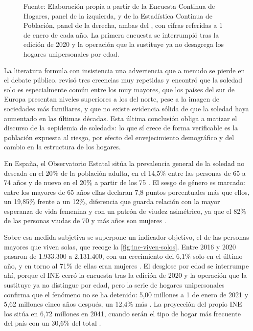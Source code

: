 \begin{figure}[tbp]
    \vspace{2pt}
    \parbox{0.94\textwidth}{\footnotesize Fuente: Elaboración propia a partir de la Encuesta Continua de Hogares, panel de la izquierda, y de la Estadística Continua de Población, panel de la derecha, ambas del \textcite{INEech2020,INEecp2026}, con cifras referidas a 1 de enero de cada año. La primera encuesta se interrumpió tras la edición de 2020 y la operación que la sustituye ya no desagrega los hogares unipersonales por edad.}
\end{figure}

La literatura formula con insistencia una advertencia que a menudo se pierde en el debate público. \textcite{Dykstra2009} revisó tres creencias muy repetidas y encontró que la soledad solo es especialmente común entre los muy mayores, que los países del sur de Europa presentan niveles superiores a los del norte, pese a la imagen de sociedades más familiares, y que no existe evidencia sólida de que la soledad haya aumentado en las últimas décadas. Esta última conclusión obliga a matizar el discurso de la «epidemia de soledad»: lo que sí crece de forma verificable es la población expuesta al riesgo, por efecto del envejecimiento demográfico y del cambio en la estructura de los hogares.

En España, el Observatorio Estatal sitúa la prevalencia general de la soledad no deseada en el 20\% de la población adulta, en el 14,5\% entre las personas de 65 a 74 años y de nuevo en el 20\% a partir de los 75 \citep{SoledadES,FundacionONCE}. El sesgo de género es marcado: entre los mayores de 65 años ellas declaran 7,8 puntos porcentuales más que ellos, un 19,85\% frente a un 12\%, diferencia que guarda relación con la mayor esperanza de vida femenina y con un patrón de viudez asimétrico, ya que el 82\% de las personas viudas de 70 y más años son mujeres \citep{FundacionONCE}.

Sobre esa medida subjetiva se superpone un indicador objetivo, el de las personas mayores que viven solas, que recoge la \autoref{fig:ine-viven-solos}. Entre 2016 y 2020 pasaron de 1.933.300 a 2.131.400, con un crecimiento del 6,1\% solo en el último año, y en torno al 71\% de ellas eran mujeres \citep{INEech2020}. El desglose por edad se interrumpe ahí, porque el INE cerró la encuesta tras la edición de 2020 y la operación que la sustituye ya no distingue por edad, pero la serie de hogares unipersonales confirma que el fenómeno no se ha detenido: 5,00 millones a 1 de enero de 2021 y 5,62 millones cinco años después, un 12,4\% más \citep{INEecp2026}. La proyección del propio INE los sitúa en 6,72 millones en 2041, cuando serán el tipo de hogar más frecuente del país con un 30,6\% del total \citep{INEproyeccion2026}.


